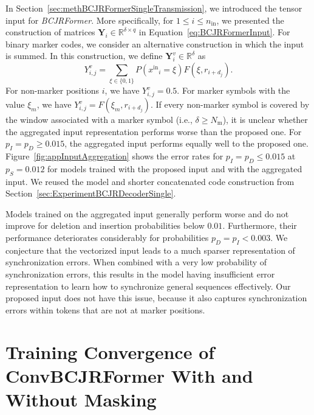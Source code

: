 \documentclass[conference,letterpaperu]{IEEEtran}
\newcommand{\pdel}{\ensuremath{p_D}}
\newcommand{\pins}{\ensuremath{p_I}}
\newcommand{\psub}{\ensuremath{p_S}}
\newcommand{\sbin}{\ensuremath{\{ 0, 1\}}}
\newcommand{\yinIx}{\ensuremath{x^{\text{in}}}}
\newcommand{\Yval}{\ensuremath{\xi}}
\newcommand{\nin}{\ensuremath{n_{\text{in}}}}
\newcommand{\recIx}{\ensuremath{r}}
\newcommand{\markerFreq}{\ensuremath{N_{\text{m}}}}
\newcommand{\bcjrformerInput}{\ensuremath{\bm{Y}}}
\newcommand{\bcjrformerInputIx}{\ensuremath{Y}}
\begin{document}
In Section~\ref{sec:methBCJRFormerSingleTransmission}, we introduced the tensor input for \textit{BCJRFormer}. More specifically, for $1 \leq i \leq \nin$, we presented the construction of matrices $\bcjrformerInput_i \in \mathbb{R}^{\delta \times q}$ in Equation~\eqref{eq:BCJRFormerInput}. For binary marker codes, we consider an alternative construction in which the input is summed. In this construction, we define $\bcjrformerInput_i^{v} \in \mathbb{R}^{\delta}$ as 
 \begin{equation}
     \label{eq:AppBCJRFormerInputAgg}
    \bcjrformerInputIx^{v}_{i,j} = \sum_{\Yval \in \sbin} P(\yinIx_i = \Yval)F(\Yval, \recIx_{i + d_j}).
 \end{equation} 
For non-marker positions $i$, we have $\bcjrformerInputIx^{v}_{i,j} = 0.5$. For marker symbols with the value $\Yval_m$, we have $\bcjrformerInputIx^{v}_{i,j} = F(\Yval_m, \recIx_{i + d_j})$. If every non-marker symbol is covered by the window associated with a marker symbol (i.e., $\delta \geq \markerFreq$), it is unclear whether the aggregated input representation performs worse than the proposed one. For $\pins = \pdel \geq 0.015$, the aggregated input performs equally well to the proposed one. Figure~\ref{fig:appInputAggregation} shows the error rates for $\pins = \pdel \leq 0.015$ at $\psub = 0.012$ for models trained with the proposed input and with the aggregated input. We reused the model and shorter concatenated code construction from Section~\ref{sec:ExperimentBCJRDecoderSingle}.

Models trained on the aggregated input generally perform worse and do not improve for deletion and insertion probabilities below $0.01$. Furthermore, their performance deteriorates considerably for probabilities $\pdel = \pins < 0.003$. We conjecture that the vectorized input leads to a much sparser representation of synchronization errors. When combined with a very low probability of synchronization errors, this results in the model having insufficient error representation to learn how to synchronize general sequences effectively. Our proposed input does not have this issue, because it also captures synchronization errors within tokens that are not at marker positions. 


\section{Training Convergence of ConvBCJRFormer With and Without Masking}
\label{sec:appTrainConvergenceOfConvBCJRFormer}
\end{document}
